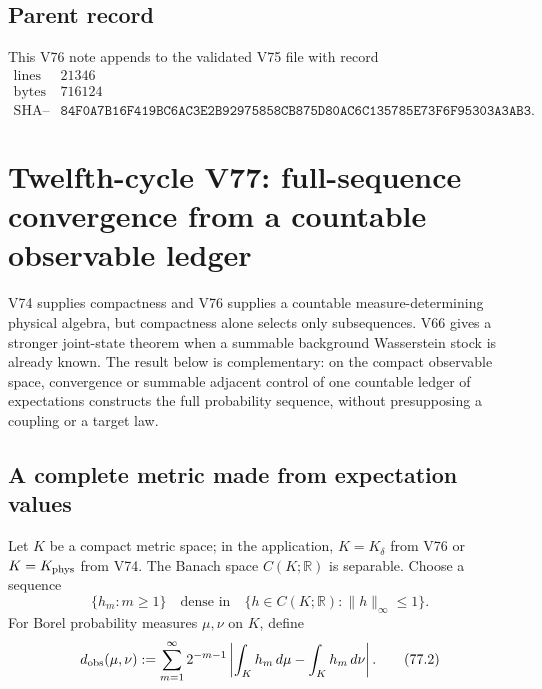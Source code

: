 \documentclass[11pt]{article}
\theoremstyle{remark}
\begin{document}
\subsection{Parent record}

This V76 note appends to the validated V75 file with record
\[
\begin{array}{c|c}
\text{lines}&21346\\
\text{bytes}&716124\\
\text{SHA--256}&
\texttt{84F0A7B16F419BC6AC3E2B92975858CB875D80AC6C135785E73F6F95303A3AB3}.
\end{array}
\]



\section{Twelfth-cycle V77: full-sequence convergence from a
countable observable ledger}
\label{sec:v12v77}

V74 supplies compactness and V76 supplies a countable
measure-determining physical algebra, but compactness alone selects
only subsequences.  V66 gives a stronger joint-state theorem when a
summable background Wasserstein stock is already known.  The result
below is complementary: on the compact observable space, convergence
or summable adjacent control of one countable ledger of expectations
constructs the full probability sequence, without presupposing a
coupling or a target law.

\subsection{A complete metric made from expectation values}

Let \(K\) be a compact metric space; in the application,
\(K=K_\delta\) from V76 or \(K=K_{\rm phys}\) from V74.  The Banach
space \(C(K;\mathbb R)\) is separable.  Choose a sequence
\[
 \{h_m:m\geq1\}
 \quad\text{dense in}\quad
 \{h\in C(K;\mathbb R):\|h\|_\infty\leq1\}.                  \tag{77.1}
\]
For Borel probability measures \(\mu,\nu\) on \(K\), define
\begin{equation}
 d_{\rm obs}(\mu,\nu)
 :=
 \sum_{m=1}^{\infty}2^{-m-1}
 \left|\int_Kh_m\,d\mu-\int_Kh_m\,d\nu\right|.               \tag{77.2}
\end{equation}
\end{document}
